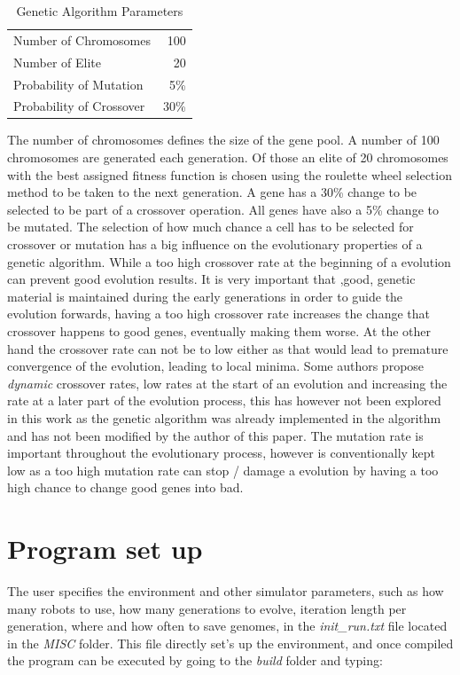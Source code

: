 \begin{table}[h]
\begin{center}
\begin{tabular}{l r}
Number of Chromosomes & 100 \\
Number of Elite & 20\\
Probability of Mutation & 5\%\\
Probability of Crossover & 30\%\\
\end{tabular}
\caption{Genetic Algorithm Parameters}
\end{center}
\end{table}

The number of chromosomes defines the size of the gene pool. 
A number of 100 chromosomes are generated each generation. Of those an elite of 20 chromosomes with the best assigned fitness function is chosen using the roulette wheel selection method to be taken to the next generation.
A gene has a 30\% change to be selected to be part of a crossover operation.
All genes have also a 5\% change to be mutated. 
The selection of how much chance a cell has to be selected for crossover or mutation has a big influence on the evolutionary properties of a genetic algorithm. While a too high crossover rate at the beginning of a evolution can prevent good evolution results.
It is very important that ,good, genetic material is maintained during the early generations in order to guide the evolution forwards, having a too high crossover rate  increases the change that crossover happens to good genes, eventually making them worse.
At the other hand the crossover rate can not be to low either as that would lead to premature convergence of the evolution, leading to local minima. 
Some authors propose \textit{dynamic} crossover rates, low rates at the start of an evolution and increasing the rate at a later part of the evolution process, this has however not been explored in this work as the genetic algorithm was already implemented in the algorithm and has not been modified by the author of this paper.
The mutation rate is important throughout the evolutionary process, however is conventionally kept low as a too high mutation rate can stop / damage a evolution by having a too high chance to change good genes into bad.

\section{Program set up}
The user specifies the  environment and other simulator parameters, such as how many robots to use, how many generations to evolve, iteration length per generation, where and how often to save genomes, in the \textit{init\_run.txt} file located in the \textit{MISC} folder. 
This file directly set's up the environment, and once compiled the program can be executed by going to the \textit{build} folder and typing:\\

